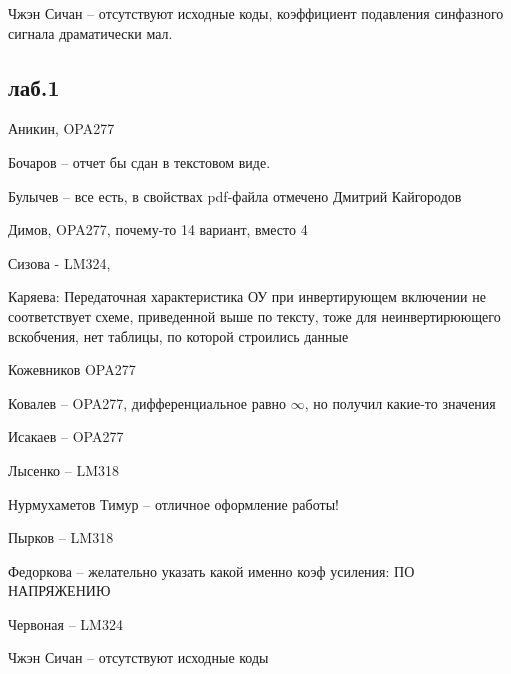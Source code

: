 \documentclass[a4paper,11pt]{article}
\begin{document}
Чжэн Сичан -- отсутствуют исходные коды, коэффициент подавления синфазного сигнала драматически мал.

\newpage
\subsection*{лаб.1}
Аникин, OPA277  

Бочаров -- отчет бы сдан в текстовом виде.

Булычев -- все есть, в свойствах pdf-файла отмечено Дмитрий Кайгородов

Димов, OPA277, почему-то 14 вариант, вместо 4

Сизова - LM324, 

Каряева: Передаточная характеристика ОУ при инвертирующем включении не соответствует схеме, приведенной выше по тексту, тоже для неинвертирюющего вскобчения,
нет таблицы, по которой строились данные

Кожевников OPA277

Ковалев -- OPA277, дифференциальное равно $\infty$, но получил какие-то значения

Исакаев   -- OPA277

Лысенко -- LM318

Нурмухаметов Тимур -- отличное оформление работы!

Пырков -- LM318

Федоркова -- желательно указать какой именно коэф усиления: ПО НАПРЯЖЕНИЮ

Червоная -- LM324

Чжэн Сичан -- отсутствуют исходные коды
\end{document}
